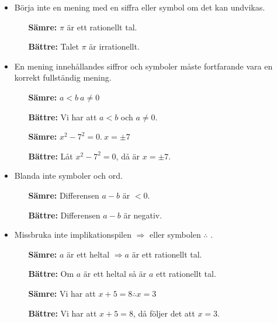 \documentclass[titlepage]{article}
\begin{document}
\begin{itemize}
    \item Börja inte en mening med en siffra eller symbol om det kan undvikas.
        \begin{itemize}[leftmargin=20mm]
            \item[\textbf{Sämre:}] $\pi$ är ett rationellt tal.
            \item[\textbf{Bättre:}] Talet $\pi$ är irrationellt. 
        \end{itemize}
    \item En mening innehållandes siffror och symboler måste fortfarande vara en korrekt fullständig mening.
        \begin{itemize}[leftmargin=20mm]
            \item[\textbf{Sämre:}] $a < b \: a \neq 0$
            \item[\textbf{Bättre:}] Vi har att $a<b$ och $a \neq 0$.
            \vspace{2mm}
            \item[\textbf{Sämre:}] $x^2 - 7^2 = 0.\: x = \pm 7$
            \item[\textbf{Bättre:}] Låt $x^2 - 7^2 = 0$, då är $x = \pm 7.$
        \end{itemize}
    \item Blanda inte symboler och ord.
        \begin{itemize}[leftmargin=20mm]
            \item[\textbf{Sämre:}] Differensen $a-b$ är $<0$.
            \item[\textbf{Bättre:}] Differensen $a-b$ är negativ.
        \end{itemize}
    \item Missbruka inte implikationspilen $\Rightarrow$ eller symbolen $\therefore$ .
        \begin{itemize}[leftmargin=20mm]
            \item[\textbf{Sämre:}] $a$ är ett heltal $\Rightarrow a$ är ett rationellt tal.
            \item[\textbf{Bättre:}] Om $a$ är ett heltal så är $a$ ett rationellt tal.
            \vspace{2mm}
            \item[\textbf{Sämre:}] Vi har att $x+5=8 \therefore x = 3$
            \item[\textbf{Bättre:}]  Vi har att $x+5=8$, då följer det att $x = 3$.
        \end{itemize}
\end{itemize}
\end{document}
